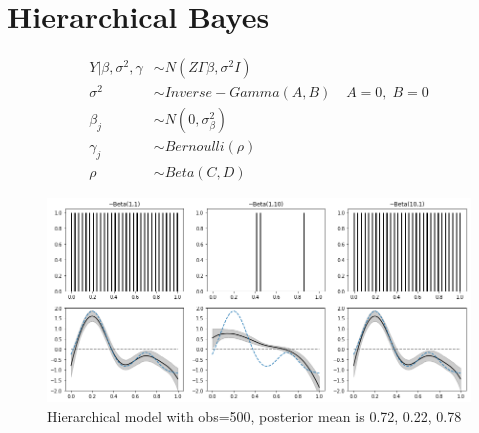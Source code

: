 \documentclass[11pt]{article}
\begin{document}
	\section{Hierarchical Bayes}
	\begin{align*}
		Y|\beta,\sigma^2 ,\gamma &\sim N(Z\Gamma\beta , \sigma^2 I)\\
		\sigma^2 &\sim Inverse-Gamma(A,B)  \;\;\;\ A=0,\;B=0\\
		\beta_j &\sim N(0, \sigma_{\beta}^2)\\
		\gamma_j &\sim Bernoulli(\rho)\\
		\rho &\sim Beta(C,D)
	\end{align*}
	\begin{figure} [h]
		\centering
		\includegraphics[width=1\linewidth]{output_35_1}
		\caption{Hierarchical model with obs=500, posterior mean is 0.72, 0.22, 0.78}
		\label{fig:output351}
	\end{figure}
	
\end{document}
